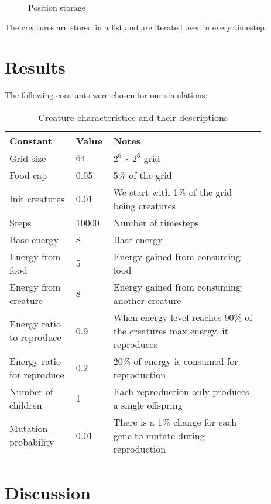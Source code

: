 \documentclass{report}
\begin{document}
\begin{figure}[!h]
\begin{center}
\caption{Position storage}
\end{center}
\end{figure}
The creatures are stored in a list and are iterated over in every timestep.
\section{Results}
The following constants were chosen for our simulations:
\begin{table}[H]
    \begin{center}
        \begin{tabular}{|p{0.24\linewidth} |p{0.08\linewidth}|p{0.55\linewidth}|}
        \hline
        Constant & Value & Notes  \\\hline
        Grid size & \(64\) & \(2^6\times 2^6\) grid\\\hline        
        Food cap & 0.05 & 5\% of the grid\\\hline
        Init creatures & 0.01 & We start with 1\% of the grid being creatures\\\hline
        Steps & 10000 & Number of timesteps\\\hline
        Base energy & 8 & Base energy\\\hline
        Energy from food & 5 & Energy gained from consuming food\\\hline
        Energy from creature & 8 & Energy gained from consuming another creature\\\hline
        Energy ratio to reproduce & 0.9 & When energy level reaches 90\% of the creatures max energy, it reproduces\\\hline
        Energy ratio for reproduce & 0.2 & 20\% of energy is consumed for reproduction\\\hline
        Number of children & 1 & Each reproduction only produces a single offspring\\\hline
        Mutation probability & 0.01 & There is a 1\% change for each gene to mutate during reproduction\\\hline
    \end{tabular}
    \caption{Creature characteristics and their descriptions}
    \end{center}
    \end{table}
\section{Discussion}
\nocite{*}


\end{document}
